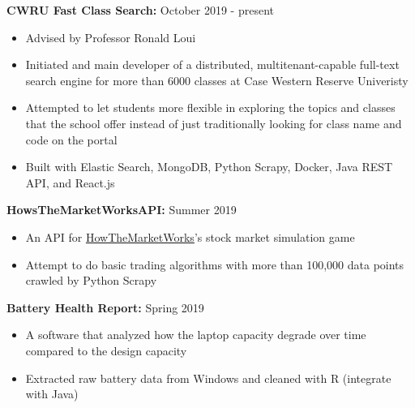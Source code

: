 \documentclass[a4paper,11pt]{article}
\begin{document}
\begin{flushleft}
	
	\textbf{CWRU Fast Class Search:} October 2019 - present
	\vspace{-\topsep}
	\begin{itemize}
		\setlength{\parskip}{2pt}
		\setlength{\itemsep}{0pt plus 1pt}
		\item Advised by Professor Ronald Loui
		\item Initiated and main developer of a distributed, multitenant-capable full-text search engine for more than 6000 classes at Case Western Reserve Univeristy
		\item Attempted to let students more flexible in exploring the topics and classes that the school offer instead of just traditionally looking for class name and code on the portal
		\item Built with Elastic Search, MongoDB, Python Scrapy, Docker, Java REST API, and React.js
	\end{itemize}
	
	\textbf{HowsTheMarketWorksAPI: } Summer 2019
	\vspace{-\topsep}
	\begin{itemize}
		\setlength{\parskip}{2pt}
		\setlength{\itemsep}{0pt plus 1pt}
		\item An API for \href{https://www.howthemarketworks.com/}{HowTheMarketWorks}'s stock market simulation game 
		\item Attempt to do basic trading algorithms with more than 100,000 data points crawled by Python Scrapy
	\end{itemize}	
	
	\textbf{Battery Health Report: } Spring 2019
	\vspace{-\topsep}
	\begin{itemize}
		\setlength{\parskip}{2pt}
		\setlength{\itemsep}{0pt plus 1pt}
		\item A software that analyzed how the laptop capacity degrade over time compared to the design capacity 
		\item Extracted raw battery data from Windows and cleaned with R (integrate with Java)
	\end{itemize}
	
\centering{\noindent\makebox{\rule{8cm}{1.5pt}}}
\end{flushleft}
\end{document}
